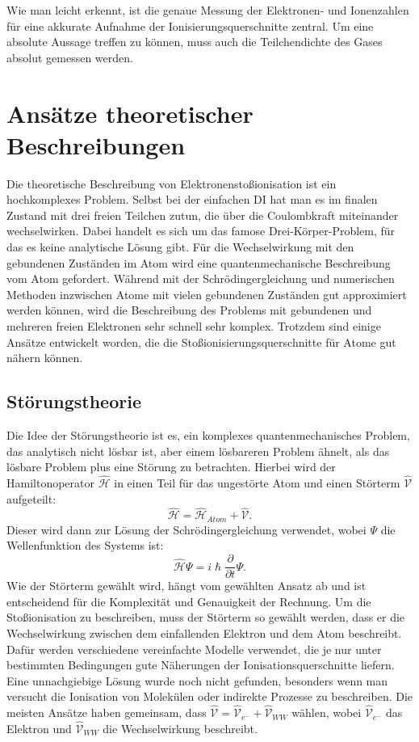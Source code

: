 Wie man leicht erkennt, ist die genaue Messung der Elektronen- und Ionenzahlen für eine akkurate Aufnahme der Ionisierungsquerschnitte zentral. Um eine absolute Aussage treffen zu können, muss auch die Teilchendichte des Gases absolut gemessen werden.

\section{Ansätze theoretischer Beschreibungen}
Die theoretische Beschreibung von Elektronenstoßionisation ist ein hochkomplexes Problem. Selbst bei der einfachen DI hat man es im finalen Zustand mit drei freien Teilchen zutun, die über die Coulombkraft miteinander wechselwirken. Dabei handelt es sich um das famose Drei-Körper-Problem, für das es keine analytische Lösung gibt. Für die Wechselwirkung mit den gebundenen Zuständen im Atom wird eine quantenmechanische Beschreibung vom Atom gefordert. Während mit der Schrödingergleichung und numerischen Methoden inzwischen Atome mit vielen gebundenen Zuständen gut approximiert werden können, wird die Beschreibung des Problems mit gebundenen und mehreren freien Elektronen sehr schnell sehr komplex. Trotzdem sind einige Ansätze entwickelt worden, die die Stoßionisierungsquerschnitte für Atome gut nähern können.

\subsection{Störungstheorie}
Die Idee der Störungstheorie ist es, ein komplexes quantenmechanisches Problem, das analytisch nicht lösbar ist, aber einem lösbareren Problem ähnelt, als das lösbare Problem plus eine Störung zu betrachten. Hierbei wird der Hamiltonoperator $\hat{\mathcal{H}}$ in einen Teil für das ungestörte Atom und einen Störterm $\hat{\mathcal{V}}$ aufgeteilt:
\begin{equation}
    \hat{\mathcal{H}} = \hat{\mathcal{H}}_{Atom} + \hat{\mathcal{V}}.
\end{equation}
Dieser wird dann zur Lösung der Schrödingergleichung verwendet, wobei $\Psi$ die Wellenfunktion des Systems ist:
\begin{equation}
    \hat{\mathcal{H}} \Psi = i\hslash\frac{\partial}{\partial t}\Psi.
\end{equation}
Wie der Störterm gewählt wird, hängt vom gewählten Ansatz ab und ist entscheidend für die Komplexität und Genauigkeit der Rechnung. Um die Stoßionisation zu beschreiben, muss der Störterm so gewählt werden, dass er die Wechselwirkung zwischen dem einfallenden Elektron und dem Atom beschreibt. Dafür werden verschiedene vereinfachte Modelle verwendet, die je nur unter bestimmten Bedingungen gute Näherungen der Ionisationsquerschnitte liefern. Eine unnachgiebige Lösung wurde noch nicht gefunden, besonders wenn man versucht die Ionisation von Molekülen oder indirekte Prozesse zu beschreiben. Die meisten Ansätze haben gemeinsam, dass $\hat{\mathcal{V}} = \hat{\mathcal{V}}_{e^-} + \hat{\mathcal{V}}_{WW}$ wählen, wobei $\hat{\mathcal{V}}_{e^-}$ das Elektron und $\hat{\mathcal{V}}_{WW}$ die Wechselwirkung  beschreibt. 

